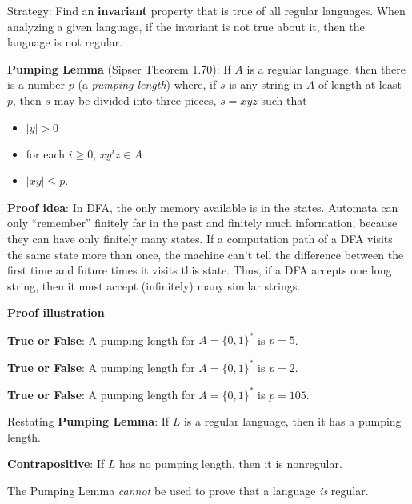 \documentclass[12pt, oneside]{article}
\begin{document}
\newpage

Strategy: Find an {\bf invariant} property that is true of all regular languages. When analyzing 
a given language, if the invariant is not true about it, then the language is not regular.

\vfill

{\bf Pumping Lemma} (Sipser Theorem 1.70): If $A$ is a regular language, then there
is a number $p$ (a {\it pumping length}) where, if $s$ is any string in $A$ of length at least $p$, 
then $s$ may be divided into three pieces, $s = xyz$ such that
\vspace{-10pt}
\begin{itemize}
\item $|y| > 0$
\item for each $i \geq 0$, $xy^i z \in A$
\item $|xy| \leq p$.
\end{itemize}
\vfill

{\bf Proof idea}: In DFA, the only memory available is in the states. 
Automata can only
``remember'' finitely far in the past and finitely much information, because
they can have only finitely many states. If a computation path of a DFA visits 
the same state more than once, the machine can't tell the difference between 
the first time and future times it visits this state. Thus, if 
a DFA accepts one long string, then it must accept (infinitely) many 
similar strings.
\vfill

{\bf Proof illustration}


\vfill
\vfill


\newpage

{\bf True or False}: A pumping length for $A = \{ 0,1 \}^*$ is $p = 5$.

\vfill


{\bf True or False}: A pumping length for $A = \{ 0,1 \}^*$ is $p = 2$.

\vfill



{\bf True or False}: A pumping length for $A = \{ 0,1 \}^*$ is $p = 105$.

\vfill



Restating {\bf Pumping Lemma}: If $L$ is a regular language, then it  has
a pumping length.


{\bf Contrapositive}: If $L$ has no pumping length, then  it is nonregular.

\vfill

{\Large The Pumping Lemma {\it cannot} be used to prove that a language {\it is} regular.} 
\end{document}

